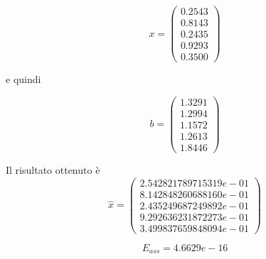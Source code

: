 \[
x = \begin{pmatrix}
0.2543\\
0.8143\\
0.2435\\
0.9293\\
0.3500
\end{pmatrix}
\]

e quindi

\[
b = \begin{pmatrix}
1.3291\\
1.2994\\
1.1572\\
1.2613\\
1.8446
\end{pmatrix}
\]

Il risultato ottenuto è
\[
\hat{x} = \begin{pmatrix}
2.542821789715319e-01\\
8.142848260688160e-01\\
2.435249687249892e-01\\
9.292636231872273e-01\\
3.499837659848094e-01
\end{pmatrix}
\]

\[
E_{ass} = 4.6629e-16
\]

